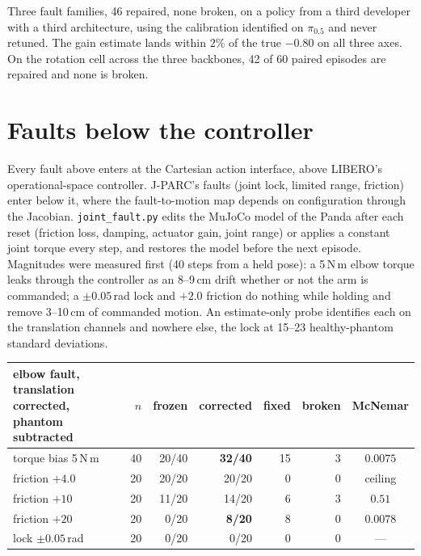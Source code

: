 \documentclass[11pt,a4paper]{article}
\newcommand{\code}[1]{\texttt{\small #1}}
\begin{document}
Three fault families, 46 repaired, none broken, on a policy from a third developer with a
third architecture, using the calibration identified on $\pi_{0.5}$ and never retuned. The
gain estimate lands within $2\%$ of the true $-0.80$ on all three axes. On the rotation cell
across the three backbones, 42 of 60 paired episodes are repaired and none is broken.

\section{Faults below the controller}
\label{sec:joint}

Every fault above enters at the Cartesian action interface, above LIBERO's operational-space
controller. J-PARC's faults (joint lock, limited range, friction) enter below it, where the
fault-to-motion map depends on configuration through the Jacobian. \code{joint\_fault.py}
edits the MuJoCo model of the Panda after each reset (friction loss, damping, actuator gain,
joint range) or applies a constant joint torque every step, and restores the model before the
next episode. Magnitudes were measured first (40 steps from a held pose): a 5\,N\,m elbow torque
leaks through the controller as an 8--9\,cm drift whether or not the arm is commanded; a
$\pm0.05$\,rad lock and $+2.0$ friction do nothing while holding and remove 3--10\,cm of
commanded motion. An estimate-only probe identifies each on the translation channels and
nowhere else, the lock at 15--23 healthy-phantom standard deviations.

\begin{center}\small
\begin{tabular}{lrrrrrc}
\toprule
elbow fault, translation corrected, phantom subtracted & $n$ & frozen & corrected & fixed & broken & McNemar \\
\midrule
torque bias 5\,N\,m & 40 & 20/40 & \textbf{32/40} & 15 & 3 & $0.0075$ \\
friction $+4.0$ & 20 & 20/20 & 20/20 & 0 & 0 & ceiling \\
friction $+10$ & 20 & 11/20 & 14/20 & 6 & 3 & $0.51$ \\
friction $+20$ & 20 & 0/20 & \textbf{8/20} & 8 & 0 & $0.0078$ \\
lock $\pm0.05$\,rad & 20 & 0/20 & 0/20 & 0 & 0 & --- \\
\bottomrule
\end{tabular}
\end{center}
\end{document}

